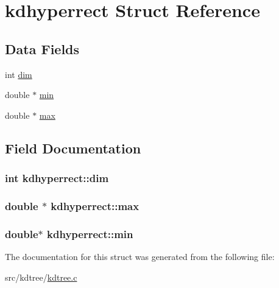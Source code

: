 \hypertarget{structkdhyperrect}{}\section{kdhyperrect Struct Reference}
\label{structkdhyperrect}
\subsection*{Data Fields}
\begin{DoxyCompactItemize}
\item 
int \hyperlink{structkdhyperrect_a3db4daba51eb2a53cf9e94a6dbe8316a}{dim}
\item 
double $\ast$ \hyperlink{structkdhyperrect_a57d70c409c2bda502c3aa8fea80cc4f4}{min}
\item 
double $\ast$ \hyperlink{structkdhyperrect_aaeaab78eb4536bcd8d4ae4d5e08540f5}{max}
\end{DoxyCompactItemize}


\subsection{Field Documentation}
\hypertarget{structkdhyperrect_a3db4daba51eb2a53cf9e94a6dbe8316a}{}
\subsubsection[{dim}]{\setlength{\rightskip}{0pt plus 5cm}int kdhyperrect\+::dim}\label{structkdhyperrect_a3db4daba51eb2a53cf9e94a6dbe8316a}
\hypertarget{structkdhyperrect_aaeaab78eb4536bcd8d4ae4d5e08540f5}{}
\subsubsection[{max}]{\setlength{\rightskip}{0pt plus 5cm}double $\ast$ kdhyperrect\+::max}\label{structkdhyperrect_aaeaab78eb4536bcd8d4ae4d5e08540f5}
\hypertarget{structkdhyperrect_a57d70c409c2bda502c3aa8fea80cc4f4}{}
\subsubsection[{min}]{\setlength{\rightskip}{0pt plus 5cm}double$\ast$ kdhyperrect\+::min}\label{structkdhyperrect_a57d70c409c2bda502c3aa8fea80cc4f4}


The documentation for this struct was generated from the following file\+:\begin{DoxyCompactItemize}
\item 
src/kdtree/\hyperlink{kdtree_8c}{kdtree.\+c}\end{DoxyCompactItemize}
